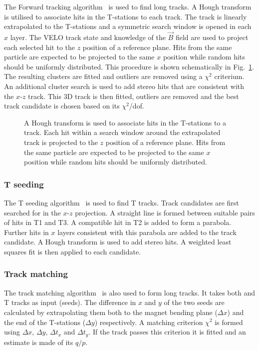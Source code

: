 The Forward tracking algorithm~\cite{patforward} is used to find long tracks. A Hough transform is utilised to associate hits in the T-stations to each \velo track. The \velo track is linearly extrapolated to the T-stations and a symmetric search window is opened in each $x$ layer. The VELO track state and knowledge of the $\vec{B}$ field are used to project each selected hit to the $z$ position of a reference plane. Hits from the same particle are expected to be projected to the same $x$ position while random hits should be uniformly distributed. This procedure is shown schematically in Fig.~\ref{fig:forward-tracking}. The resulting clusters are fitted and outliers are removed using a $\chi^{2}$ criterium. An additional cluster search is used to add stereo hits that are consistent with the $x$-$z$ track. This 3D track is then fitted, outliers are removed and the best track candidate is chosen based on its $\chi^{2}$/dof.

\begin{figure}[!tb]
  \centering
  
  \caption{A Hough transform is used to associate hits in the T-stations to a \velo track. Each hit within a search window around the extrapolated track is projected to the $z$ position of a reference plane. Hits from the same particle are expected to be projected to the same $x$ position while random hits should be uniformly distributed.}
  \label{fig:forward-tracking}
\end{figure}

\subsubsection{T seeding}
\label{sec:track:algos:seeding}

The T seeding algorithm~\cite{patseeding} is used to find T tracks. Track candidates are first searched for in the $x$-$z$ projection. A straight line is formed between suitable pairs of hits in T1 and T3. A compatible hit in T2 is added to form a parabola. Further hits in $x$ layers consistent with this parabola are added to the track candidate. A Hough transform is used to add stereo hits. A weighted least squares fit is then applied to each candidate.

\subsubsection{Track matching}
\label{sec:track:algos:match}

The track matching algorithm~\cite{patmatch} is also used to form long tracks. It takes both \velo and T tracks as input (seeds). The difference in $x$ and $y$ of the two seeds are calculated by extrapolating them both to the magnet bending plane ($\Delta x$) and the end of the T-stations ($\Delta y$) respectively. A matching criterion $\chi^{2}$ is formed using $\Delta x$, $\Delta y$, $\Delta t_{x}$ and $\Delta t_{y}$. If the track passes this criterion it is fitted and an estimate is made of its $q/p$.


